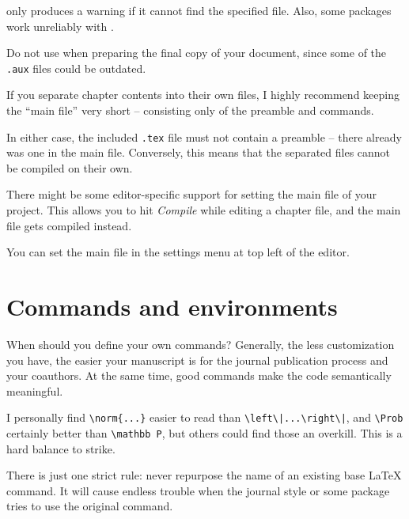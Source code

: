 \begin{gotcha}
 only produces a warning if it cannot find the specified file.
Also, some packages work unreliably with .

Do not use  when preparing the final copy of your document,
since some of the \verb|.aux| files could be outdated.
\end{gotcha}

\begin{practices}
If you separate chapter contents into their own files,
I highly recommend keeping the ``main file'' very short
-- consisting only of the preamble and  commands.
\end{practices}

In either case,
the included \verb|.tex| file must not contain a preamble --
there already was one in the main file.
Conversely, this means that the separated files cannot be compiled on their own.

There might be some editor-specific support for setting the main file of your project.
This allows you to hit \emph{Compile} while editing a chapter file,
and the main file gets compiled instead.

\begin{overleaf}
You can set the main file in the settings menu at top left of the editor.
\end{overleaf}




%
%
%
\section{Commands and environments}

\begin{practices}
When should you define your own commands?
Generally, the less customization you have,
the easier your manuscript is for the journal publication process and your coauthors.
At the same time, good commands make the code semantically meaningful.

I personally find \verb&\norm{...}& easier to read than \verb&\left\|...\right\|&,
and \verb|\Prob| certainly better than \verb|\mathbb P|,
but others could find those an overkill.
This is a hard balance to strike.

There is just one strict rule:
never repurpose the name of an existing base \LaTeX{} command.
It will cause endless trouble when the journal style or some package tries to use the original command.
\end{practices}


